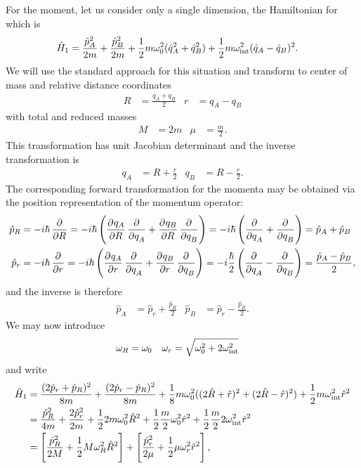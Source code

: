 For the moment, let us consider only a single dimension, the Hamiltonian for which is
\begin{align}
	\hat{H}_1
	&= \frac{\hat{p}_A^2}{2 m} + \frac{\hat{p}_B^2}{2 m}
		+ \frac{1}{2} m \omega_0^2 (\hat{q}_A^2 + \hat{q}_B^2)
		+ \frac{1}{2} m \omega_\text{int}^2 (\hat{q}_A - \hat{q}_B)^2.
\end{align}
We will use the standard approach for this situation and transform to center of mass and relative distance coordinates
\begin{align}
	R
	&= \frac{q_A + q_B}{2}
	&
	r
	&= q_A - q_B
		\label{eq:oscillators-Rr}
\end{align}
with total and reduced masses
\begin{align}
	M
	&= 2 m
	&
	\mu
	&= \frac{m}{2}.
\end{align}
This transformation has unit Jacobian determinant and the inverse transformation is
\begin{align}
	q_A
	&= R + \frac{r}{2}
	&
	q_B
	&= R - \frac{r}{2}.
\end{align}
The corresponding forward transformation for the momenta may be obtained via the position representation of the momentum operator:
\begin{subequations}
\begin{align}
	\hat{p}_R
	&= -i \hbar \dpd{}{R}
	= -i \hbar \left( \dpd{q_A}{R} \dpd{}{q_A} + \dpd{q_B}{R} \dpd{}{q_B} \right)
	= -i \hbar \left( \dpd{}{q_A} + \dpd{}{q_B} \right)
	= \hat{p}_A + \hat{p}_B \\
	\hat{p}_r
	&= -i \hbar \dpd{}{r}
	= -i \hbar \left( \dpd{q_A}{r} \dpd{}{q_A} + \dpd{q_B}{r} \dpd{}{q_B} \right)
	= -i \frac{\hbar}{2} \left( \dpd{}{q_A} - \dpd{}{q_B} \right)
	= \frac{\hat{p}_A - \hat{p}_B}{2},
\end{align}
\end{subequations}
and the inverse is therefore
\begin{align}
	\hat{p}_A
	&= \hat{p}_r + \frac{\hat{p}_R}{2}
	&
	\hat{p}_B
	&= \hat{p}_r - \frac{\hat{p}_R}{2}.
\end{align}
We may now introduce
\begin{align}
	\omega_R
	&= \omega_0
	&
	\omega_r
	&= \sqrt{\omega_0^2 + 2 \omega_\text{int}^2}
\end{align}
and write
\begin{subequations}
\begin{align}
	\hat{H}_1
	&= \frac{(2 \hat{p}_r + \hat{p}_R)^2}{8 m}
		+ \frac{(2 \hat{p}_r - \hat{p}_R)^2}{8 m}
		+ \frac{1}{8} m \omega_0^2 ((2 \hat{R} + \hat{r})^2 + (2 \hat{R} - \hat{r})^2)
		+ \frac{1}{2} m \omega_\text{int}^2 \hat{r}^2 \\
	&= \frac{\hat{p}_R^2}{4 m} + \frac{2 \hat{p}_r^2}{2 m}
		+ \frac{1}{2} 2 m \omega_0^2 \hat{R}^2
		+ \frac{1}{2} \frac{m}{2} \omega_0^2 \hat{r}^2
		+ \frac{1}{2} \frac{m}{2} 2 \omega_\text{int}^2 \hat{r}^2 \\
	&= \left[ \frac{\hat{p}_R^2}{2 M} + \frac{1}{2} M \omega_R^2 \hat{R}^2 \right]
		+ \left[ \frac{\hat{p}_r^2}{2 \mu} + \frac{1}{2} \mu \omega_r^2 \hat{r}^2 \right],
\end{align}
\end{subequations}

